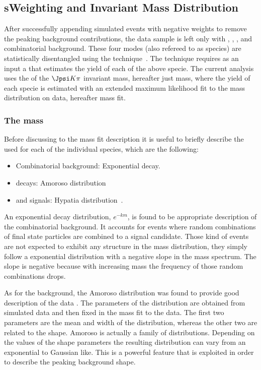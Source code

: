 \subsection{sWeighting and Invariant Mass Distribution}
\label{sWeighting_and_mass}

After successfully appending simulated events with negative weights to remove the peaking background contributions, the data sample is left only with
\BdJpsiKpi, \BsJpsiKpi, \LbJpsippi, and combinatorial background. These four modes (also refereed to as species) are statistically
disentangled using the \sPlot technique~\cite{splot}. The technique requires as an input a \pdf that estimates the yield of each
of the above specie. The current analysis uses the \pdf of the $\Jpsi K\pi$ invariant mass, hereafter just mass, where the yield of each specie
is estimated with an extended maximum likelihood fit to the mass distribution on data, hereafter mass fit.

\subsubsection{The mass \pdf}
Before discussing to the mass fit description it is useful to briefly describe the \pdfs used for each of the individual species, which are the following:

\begin{itemize}
\item Combinatorial background: Exponential decay.
\item \LbJpsippi decays: Amoroso distribution~\cite{Amoroso}
\item \Bd and \Bs signals: Hypatia distribution~\cite{Santos:2013gra}.
\end{itemize}

\noindent An exponential decay distribution, $e^{-km}$, is found to be appropriate description of the combinatorial background. It  accounts
for events where random combinations of final state particles are combined to a signal candidate. Those kind of events are not expected to
exhibit any structure in the mass distribution, they simply follow a exponential distribution with a negative slope in the mass spectrum. The slope is
negative because with increasing mass the frequency of those random combinations drops.

As for the \LbJpsippi background, the Amoroso distribution was found to provide good description of the data .
The parameters of the distribution are obtained from simulated data and then fixed in the mass fit to the data. The first two parameters
are the mean and width of the distribution, whereas the other two are related to the shape. Amoroso is actually a family of distributions.
Depending on the values of the shape parameters the resulting distribution can vary from an exponential to Gaussian like. This is a powerful
feature that is exploited in order to describe the \LbJpsippi peaking background shape.

